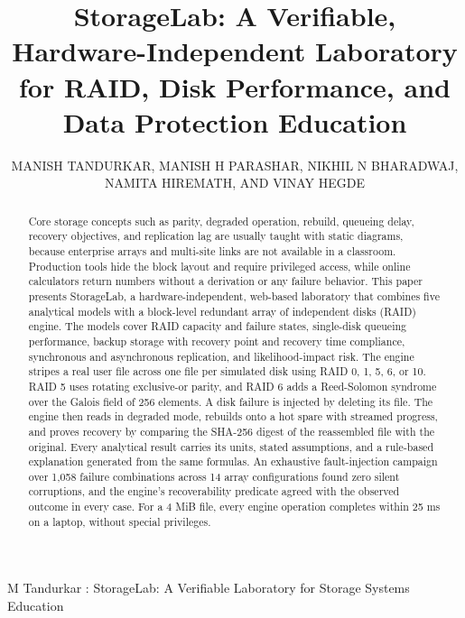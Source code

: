 \documentclass{ieeeaccess}
\begin{document}

\title{StorageLab: A Verifiable, Hardware-Independent Laboratory for RAID, Disk Performance, and Data Protection Education}
\author{\uppercase{Manish Tandurkar}, \uppercase{Manish H Parashar}, \uppercase{Nikhil N Bharadwaj}, \uppercase{Namita Hiremath}, \uppercase{and Vinay Hegde}}
\address[1]{Department of Computer Science and Engineering, RV College of Engineering, Bengaluru 560059, India (e-mail: manishtandurkar.cs23@rvce.edu.in; manishhparashar.cs23@rvce.edu.in; nikhilnb.cs23@rvce.edu.in; namitahiremath.cs23@rvce.edu.in; vinayvhegde@rvce.edu.in)}

 {M Tandurkar \headeretal: StorageLab: A Verifiable Laboratory for Storage Systems Education}


\begin{abstract}
Core storage concepts such as parity, degraded operation, rebuild, queueing delay, recovery objectives, and replication lag are usually taught with static diagrams, because enterprise arrays and multi-site links are not available in a classroom. Production tools hide the block layout and require privileged access, while online calculators return numbers without a derivation or any failure behavior. This paper presents StorageLab, a hardware-independent, web-based laboratory that combines five analytical models with a block-level redundant array of independent disks (RAID) engine. The models cover RAID capacity and failure states, single-disk queueing performance, backup storage with recovery point and recovery time compliance, synchronous and asynchronous replication, and likelihood-impact risk. The engine stripes a real user file across one file per simulated disk using RAID 0, 1, 5, 6, or 10. RAID 5 uses rotating exclusive-or parity, and RAID 6 adds a Reed-Solomon syndrome over the Galois field of 256 elements. A disk failure is injected by deleting its file. The engine then reads in degraded mode, rebuilds onto a hot spare with streamed progress, and proves recovery by comparing the SHA-256 digest of the reassembled file with the original. Every analytical result carries its units, stated assumptions, and a rule-based explanation generated from the same formulas. An exhaustive fault-injection campaign over 1,058 failure combinations across 14 array configurations found zero silent corruptions, and the engine's recoverability predicate agreed with the observed outcome in every case. For a 4 MiB file, every engine operation completes within 25 ms on a laptop, without special privileges.
\end{abstract}
\end{document}
